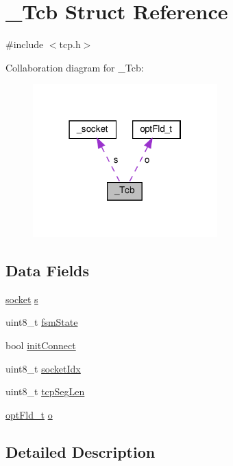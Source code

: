 \hypertarget{struct__Tcb}{}\section{\+\_\+\+Tcb Struct Reference}
\label{struct__Tcb}


{\ttfamily \#include $<$tcp.\+h$>$}



Collaboration diagram for \+\_\+\+Tcb\+:
\nopagebreak
\begin{figure}[H]
\begin{center}
\leavevmode
\includegraphics[width=202pt]{struct__Tcb__coll__graph}
\end{center}
\end{figure}
\subsection*{Data Fields}
\begin{DoxyCompactItemize}
\item 
\hyperlink{ip_8h_ae41acc846b3288ddd9085d96c8db0496}{socket} \hyperlink{struct__Tcb_a5c2b240066167fd6e82cadce2915ba81}{s}
\item 
uint8\+\_\+t \hyperlink{struct__Tcb_afaf3e24995780a19fa4ef468cd935dd0}{fsm\+State}
\item 
bool \hyperlink{struct__Tcb_ac752a140a651bc5b40c5e249a379653f}{init\+Connect}
\item 
uint8\+\_\+t \hyperlink{struct__Tcb_aecc2db02b3ede89fffb9c067c114f0a5}{socket\+Idx}
\item 
uint8\+\_\+t \hyperlink{struct__Tcb_ab0822736115f712f094a271a5beebe44}{tcp\+Seg\+Len}
\item 
\hyperlink{structoptFld__t}{opt\+Fld\+\_\+t} \hyperlink{struct__Tcb_ac32397104bce5cce55db3b8753792435}{o}
\end{DoxyCompactItemize}


\subsection{Detailed Description}


